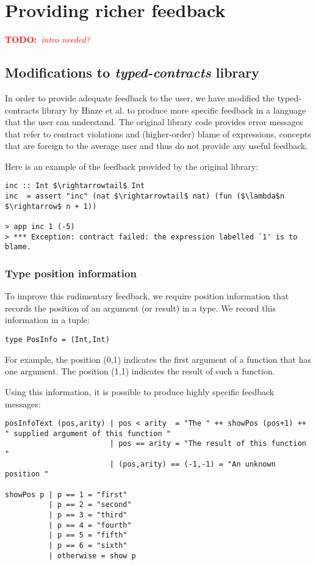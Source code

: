 \documentclass[10pt]{report}
\newcommand{\annotate}[3]{
	\begin{scriptsize}
	\textcolor{#1}{\textbf{#2}~\textit{#3}}
	\end{scriptsize}\newline}
\newcommand{\todo}[1]{\annotate{red} {TODO:} {#1}}
\begin{document}
\section{Providing richer feedback}

\todo{intro needed?}

\subsection{Modifications to \textit{typed-contracts} library}
\label{modificationstotypedcontracts}
In order to provide adequate feedback to the user, we have modified the typed-contracts library by Hinze et al. \cite{Hinze06typedcontracts} to produce more specific feedback in a language that the user can understand.
The original library code provides error messages that refer to contract violations and (higher-order) blame of expressions, concepts that are foreign to the average user and thus do not provide any useful feedback.

Here is an example of the feedback provided by the original library:

\begin{lstlisting}[mathescape]
inc :: Int $\rightarrowtail$ Int
inc  = assert "inc" (nat $\rightarrowtail$ nat) (fun ($\lambda$n $\rightarrow$ n + 1))

> app inc 1 (-5)
> *** Exception: contract failed: the expression labelled `1' is to blame.
\end{lstlisting}

\subsubsection{Type position information}

To improve this rudimentary feedback, we require position information that records the position of an argument (or result) in a type.
We record this information in a tuple:

\begin{lstlisting}
type PosInfo = (Int,Int)
\end{lstlisting}

For example, the position (0,1) indicates the first argument of a function that has one argument.
The position (1,1) indicates the result of such a function.

Using this information, it is possible to produce highly specific feedback messages:

\begin{lstlisting}
posInfoText (pos,arity) | pos < arity  = "The " ++ showPos (pos+1) ++ " supplied argument of this function "
                        | pos == arity = "The result of this function "
                        | (pos,arity) == (-1,-1) = "An unknown position "

showPos p | p == 1 = "first"
          | p == 2 = "second"
          | p == 3 = "third"
          | p == 4 = "fourth"
          | p == 5 = "fifth"
          | p == 6 = "sixth"
          | otherwise = show p
\end{lstlisting}
\end{document}
